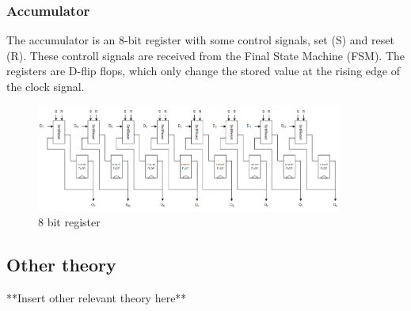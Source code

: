 \subsubsection{Accumulator}
The accumulator is an 8-bit register with some control signals, set (S) and reset (R). These controll signals are received from the Final State Machine (FSM). The registers are D-flip flops, which only change the stored value at the rising edge of the clock signal. 

\begin{figure}[H]
    \centering
    \includegraphics[width=0.9\textwidth]{Figures/8bitRegister.png}
    \caption{8 bit register}
    \label{fig:8bitregister}
\end{figure}





\subsection{Other theory}\label{subsec:theory_aSubsection}

**Insert other relevant theory here**




